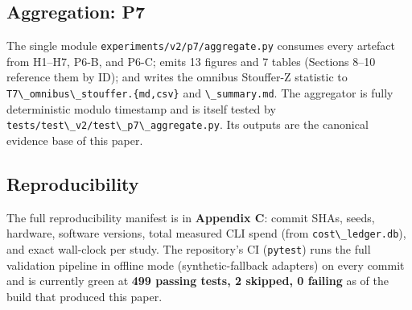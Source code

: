 \subsection{Aggregation: P7}\label{aggregation-p7}

The single module \passthrough{\lstinline!experiments/v2/p7/aggregate.py!} consumes every artefact from H1--H7, P6-B, and P6-C; emits 13 figures and 7 tables (Sections 8--10 reference them by ID); and writes the omnibus Stouffer-Z statistic to \passthrough{\lstinline!T7\_omnibus\_stouffer.\{md,csv\}!} and \passthrough{\lstinline!\_summary.md!}. The aggregator is fully deterministic modulo timestamp and is itself tested by \passthrough{\lstinline!tests/test\_v2/test\_p7\_aggregate.py!}. Its outputs are the canonical evidence base of this paper.

\subsection{Reproducibility}\label{reproducibility}

The full reproducibility manifest is in \textbf{Appendix C}: commit SHAs, seeds, hardware, software versions, total measured CLI spend (from \passthrough{\lstinline!cost\_ledger.db!}), and exact wall-clock per study. The repository's CI (\passthrough{\lstinline!pytest!}) runs the full validation pipeline in offline mode (synthetic-fallback adapters) on every commit and is currently green at \textbf{499 passing tests, 2 skipped, 0 failing} as of the build that produced this paper.
